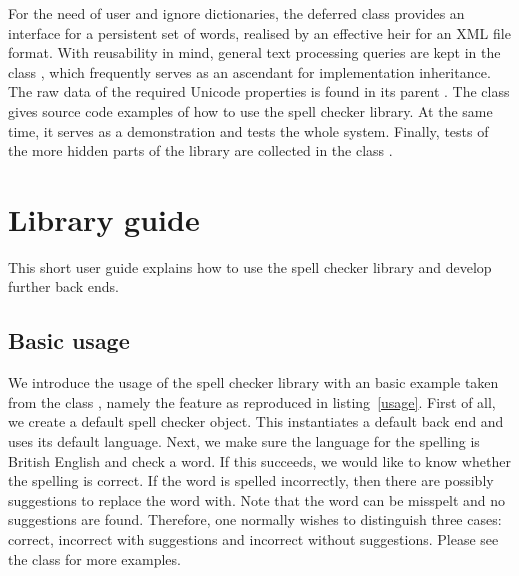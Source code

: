 \documentclass[paper=a4]{scrartcl}
\begin{document}
For the need of user and ignore dictionaries, the deferred class  provides an interface for a persistent set of words, realised by an effective heir  for an XML file format. With reusability in mind, general text processing queries are kept in the class , which frequently serves as an ascendant for implementation inheritance. The raw data of the required Unicode properties is found in its parent . The class  gives source code examples of how to use the spell checker library. At the same time, it serves as a demonstration and tests the whole system. Finally, tests of the more hidden parts of the library are collected in the class .






\section{Library guide}

This short user guide explains how to use the spell checker library and develop further back ends.

\subsection{Basic usage}

We introduce the usage of the spell checker library with an basic example taken from the class , namely the feature  as reproduced in listing~\ref{usage}. First of all, we create a default spell checker object. This instantiates a default back end and uses its default language. Next, we make sure the language for the spelling is British English and check a word. If this succeeds, we would like to know whether the spelling is correct. If the word is spelled incorrectly, then there are possibly suggestions to replace the word with. Note that the word can be misspelt and no suggestions are found. Therefore, one normally wishes to distinguish three cases: correct, incorrect with suggestions and incorrect without suggestions. Please see the class  for more examples.
\end{document}
